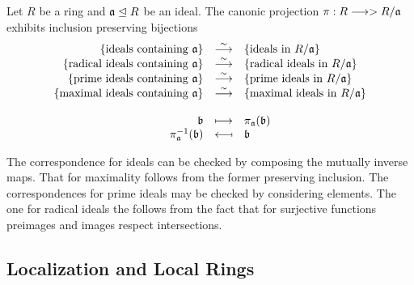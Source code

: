 	\begin{theorem}
		Let $R$ be a ring and $\mathfrak{a} \trianglelefteq R$ be an ideal. The canonic projection $\pi: R -->> R/\mathfrak{a}$ exhibits inclusion preserving bijections
		\begin{equation*}
			\begin{array}{rcl}
				\{\text{ideals containing }\ideal{a}\} &\overset{\sim}{\longrightarrow} &\{\text{ideals in } R/\ideal{a}\}\\
				\{\text{radical ideals containing }\ideal{a}\} &\overset{\sim}{\longrightarrow} &\{\text{radical ideals in } R/\ideal{a}\}\\
				\{\text{prime ideals containing }\ideal{a}\} &\overset{\sim}{\longrightarrow} &\{\text{prime ideals in } R/\ideal{a}\}\\
				\{\text{maximal ideals containing }\ideal{a}\} &\overset{\sim}{\longrightarrow} &\{\text{maximal ideals in } R/\ideal{a}\}\\\\
				\ideal{b} &\longmapsto &\pi_\ideal{a}(\ideal{b})\\
				\pi_\ideal{a}^{-1}(\ideal{b}) &\reflectbox{$\longmapsto$} &\ideal{b}
			\end{array}
		\end{equation*}
	\end{theorem}
	\begin{sketch}
		The correspondence for ideals can be checked by composing the mutually inverse maps. That for maximality follows from the former preserving inclusion. The correspondences for prime ideals may be checked by considering elements. The one for radical ideals the follows from the fact that for surjective functions preimages and images respect intersections. 
	\end{sketch}


	\newpage
	\subsection{Localization and Local Rings}

